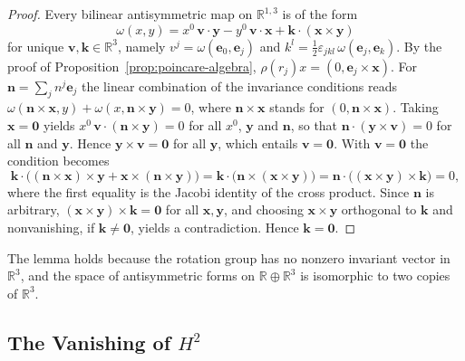 	\begin{proof}
		Every bilinear antisymmetric map on $\mathbb{R}^{1,3}$ is of the form
		\begin{equation*}
			\omega(x,y)=x^0\,\mathbf{v}\cdot\mathbf{y}-y^0\,\mathbf{v}\cdot\mathbf{x}+\mathbf{k}\cdot(\mathbf{x}\times\mathbf{y})
		\end{equation*}
		for unique $\mathbf{v},\mathbf{k}\in\mathbb{R}^3$, namely $v^j=\omega(\mathbf{e}_0,\mathbf{e}_j)$ and $k^l=\tfrac12\varepsilon_{jkl}\,\omega(\mathbf{e}_j,\mathbf{e}_k)$. By the proof of Proposition~\ref{prop:poincare-algebra}, $\rho(r_j)x=(0,\mathbf{e}_j\times\mathbf{x})$. For $\mathbf{n}=\sum_jn^j\mathbf{e}_j$ the linear combination of the invariance conditions reads $\omega(\mathbf{n}\times\mathbf{x},y)+\omega(x,\mathbf{n}\times\mathbf{y})=0$, where $\mathbf{n}\times\mathbf{x}$ stands for $(0,\mathbf{n}\times\mathbf{x})$. Taking $\mathbf{x}=\mathbf{0}$ yields $x^0\,\mathbf{v}\cdot(\mathbf{n}\times\mathbf{y})=0$ for all $x^0$, $\mathbf{y}$ and $\mathbf{n}$, so that $\mathbf{n}\cdot(\mathbf{y}\times\mathbf{v})=0$ for all $\mathbf{n}$ and $\mathbf{y}$. Hence $\mathbf{y}\times\mathbf{v}=\mathbf{0}$ for all $\mathbf{y}$, which entails $\mathbf{v}=\mathbf{0}$. With $\mathbf{v}=\mathbf{0}$ the condition becomes
		\begin{equation*}
			\mathbf{k}\cdot\big((\mathbf{n}\times\mathbf{x})\times\mathbf{y}+\mathbf{x}\times(\mathbf{n}\times\mathbf{y})\big)=\mathbf{k}\cdot\big(\mathbf{n}\times(\mathbf{x}\times\mathbf{y})\big)=\mathbf{n}\cdot\big((\mathbf{x}\times\mathbf{y})\times\mathbf{k}\big)=0,
		\end{equation*}
		where the first equality is the Jacobi identity of the cross product. Since $\mathbf{n}$ is arbitrary, $(\mathbf{x}\times\mathbf{y})\times\mathbf{k}=\mathbf{0}$ for all $\mathbf{x},\mathbf{y}$, and choosing $\mathbf{x}\times\mathbf{y}$ orthogonal to $\mathbf{k}$ and nonvanishing, if $\mathbf{k}\neq\mathbf{0}$, yields a contradiction. Hence $\mathbf{k}=\mathbf{0}$.
	\end{proof}
	
	\noindent The lemma holds because the rotation group has no nonzero invariant vector in $\mathbb{R}^3$, and the space of antisymmetric forms on $\mathbb{R}\oplus\mathbb{R}^3$ is isomorphic to two copies of $\mathbb{R}^3$.
	
	\subsection*{The Vanishing of $H^2$}
	
